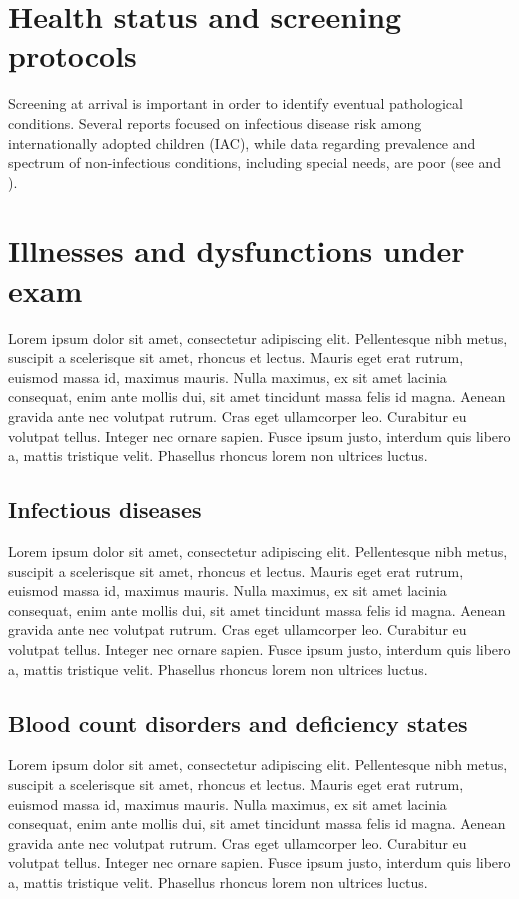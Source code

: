 \section{Health status and screening protocols}\label{sec:screeningprotocols}
Screening at arrival is important in order to identify eventual pathological conditions. Several reports focused on infectious disease risk among internationally adopted children (IAC), while data regarding prevalence and spectrum of non-infectious conditions, including special needs, are poor (see \cite{notonlyinfectious} and \cite{nonsoloinfezioni}).

\section{Illnesses and dysfunctions under exam}\label{sec:illnessesanddysfunctions}
Lorem ipsum dolor sit amet, consectetur adipiscing elit. Pellentesque nibh metus, suscipit a scelerisque sit amet, rhoncus et lectus. Mauris eget erat rutrum, euismod massa id, maximus mauris. Nulla maximus, ex sit amet lacinia consequat, enim ante mollis dui, sit amet tincidunt massa felis id magna. Aenean gravida ante nec volutpat rutrum. Cras eget ullamcorper leo. Curabitur eu volutpat tellus. Integer nec ornare sapien. Fusce ipsum justo, interdum quis libero a, mattis tristique velit. Phasellus rhoncus lorem non ultrices luctus.


\subsection{Infectious diseases}\label{sub:infectiousdiseases}
Lorem ipsum dolor sit amet, consectetur adipiscing elit. Pellentesque nibh metus, suscipit a scelerisque sit amet, rhoncus et lectus. Mauris eget erat rutrum, euismod massa id, maximus mauris. Nulla maximus, ex sit amet lacinia consequat, enim ante mollis dui, sit amet tincidunt massa felis id magna. Aenean gravida ante nec volutpat rutrum. Cras eget ullamcorper leo. Curabitur eu volutpat tellus. Integer nec ornare sapien. Fusce ipsum justo, interdum quis libero a, mattis tristique velit. Phasellus rhoncus lorem non ultrices luctus.

\subsection{Blood count disorders and deficiency states}\label{sub:bloodcountdisorders}
Lorem ipsum dolor sit amet, consectetur adipiscing elit. Pellentesque nibh metus, suscipit a scelerisque sit amet, rhoncus et lectus. Mauris eget erat rutrum, euismod massa id, maximus mauris. Nulla maximus, ex sit amet lacinia consequat, enim ante mollis dui, sit amet tincidunt massa felis id magna. Aenean gravida ante nec volutpat rutrum. Cras eget ullamcorper leo. Curabitur eu volutpat tellus. Integer nec ornare sapien. Fusce ipsum justo, interdum quis libero a, mattis tristique velit. Phasellus rhoncus lorem non ultrices luctus.

